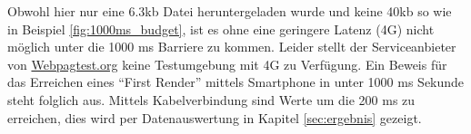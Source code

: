 	  Obwohl hier nur eine 6.3kb Datei heruntergeladen wurde und keine 40kb so wie in Beispiel \ref{fig:1000ms_budget}, ist es ohne eine geringere Latenz (4G) nicht möglich unter die 1000 ms Barriere zu kommen. Leider stellt der Serviceanbieter von \url{Webpagtest.org} keine Testumgebung mit 4G zu Verfügung. Ein Beweis für das Erreichen eines "`First Render"' mittels Smartphone in unter 1000 ms Sekunde steht folglich aus. Mittels Kabelverbindung sind Werte um die 200 ms zu erreichen, dies wird per Datenauswertung in Kapitel \ref{sec:ergebnis} gezeigt.



\pagebreak
